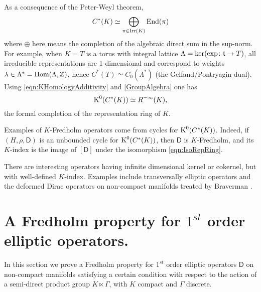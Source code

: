 \documentclass[11pt,reqno]{amsart}
\theoremstyle{definition}
\theoremstyle{remark}
\newcommand{\st}[1]{\mathsf{#1}}
\newcommand{\tn}[1]{\textnormal{#1}}
\def\t{\ensuremath{\mathfrak{t}}}
\def\K{\ensuremath{\mathcal{K}}}
\def\bZ{\ensuremath{\mathbb{Z}}}
\def\End{\ensuremath{\textnormal{End}}}
\def\Hom{\ensuremath{\textnormal{Hom}}}
\def\ker{\ensuremath{\textnormal{ker}}}
\def\K{\ensuremath{\textnormal{K}}}
\def\Irr{\ensuremath{\tn{Irr}}}
\begin{document}
As a consequence of the Peter-Weyl theorem,
\begin{equation} 
\label{GroupAlgebra}
C^\ast(K) \simeq \bigoplus_{\pi \in \Irr(K)} \End(\pi)
\end{equation}
where $\oplus$ here means the completion of the algebraic direct sum in the sup-norm.  For example, when $K=T$ is a torus with integral lattice $\Lambda=\ker(\exp\colon \t \rightarrow T)$, all irreducible representations are 1-dimensional and correspond to weights $\lambda \in \Lambda^\ast=\Hom(\Lambda,\bZ)$, hence $C^\ast(T)\simeq C_0(\Lambda^\ast)$ (the Gelfand/Pontryagin dual).  Using \eqref{eqn:KHomologyAdditivity} and \eqref{GroupAlgebra} one has
\begin{equation} 
\label{eqn:IsoRepRing}
\K^0(C^\ast(K)) \simeq R^{-\infty}(K),
\end{equation}
the formal completion of the representation ring of $K$.   

Examples of $K$-Fredholm operators come from cycles for $\K^0(C^\ast(K))$. Indeed, if $(H,\rho,\st{D})$ is an unbounded cycle for $\K^0(C^\ast(K))$, then $\st{D}$ is $K$-Fredholm, and its $K$-index is the image of $[\st{D}]$ under the isomorphism \eqref{eqn:IsoRepRing}.

There are interesting operators having infinite dimensional kernel or cokernel, but with well-defined $K$-index.  Examples include transversally elliptic operators \cite{AtiyahTransEll} and the deformed Dirac operators on non-compact manifolds treated by Braverman \cite{Braverman2002}.

\section{A Fredholm property for $1^{st}$ order elliptic operators.}\label{sec:FredholmProperty}
In this section we prove a Fredholm property for $1^{st}$ order elliptic operators $\st{D}$ on non-compact manifolds satisfying a certain condition with respect to the action of a semi-direct product group $K\ltimes \Gamma$, with $K$ compact and $\Gamma$ discrete.
\end{document}
